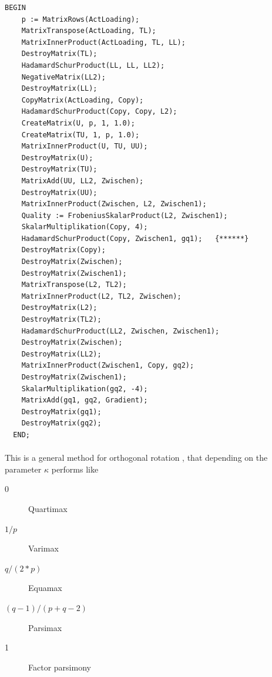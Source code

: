 \begin{lstlisting}[caption=Tandem criteria]
  BEGIN
    p := MatrixRows(ActLoading);
    MatrixTranspose(ActLoading, TL);
    MatrixInnerProduct(ActLoading, TL, LL);
    DestroyMatrix(TL);
    HadamardSchurProduct(LL, LL, LL2);
    NegativeMatrix(LL2);
    DestroyMatrix(LL);
    CopyMatrix(ActLoading, Copy);
    HadamardSchurProduct(Copy, Copy, L2);
    CreateMatrix(U, p, 1, 1.0);
    CreateMatrix(TU, 1, p, 1.0);
    MatrixInnerProduct(U, TU, UU);
    DestroyMatrix(U);
    DestroyMatrix(TU);
    MatrixAdd(UU, LL2, Zwischen);
    DestroyMatrix(UU);
    MatrixInnerProduct(Zwischen, L2, Zwischen1);
    Quality := FrobeniusSkalarProduct(L2, Zwischen1);
    SkalarMultiplikation(Copy, 4);
    HadamardSchurProduct(Copy, Zwischen1, gq1);   {******}
    DestroyMatrix(Copy);
    DestroyMatrix(Zwischen);
    DestroyMatrix(Zwischen1);
    MatrixTranspose(L2, TL2);
    MatrixInnerProduct(L2, TL2, Zwischen);
    DestroyMatrix(L2);
    DestroyMatrix(TL2);
    HadamardSchurProduct(LL2, Zwischen, Zwischen1);
    DestroyMatrix(Zwischen);
    DestroyMatrix(LL2);
    MatrixInnerProduct(Zwischen1, Copy, gq2);
    DestroyMatrix(Zwischen1);
    SkalarMultiplikation(gq2, -4);
    MatrixAdd(gq1, gq2, Gradient);
    DestroyMatrix(gq1);
    DestroyMatrix(gq2);
  END;
\end{lstlisting}

\paragraph{}

This is a general method for orthogonal rotation \parencite{Craw-70}, that depending on the parameter \(\kappa \) performs like
\begin{description}
  \item[0]{Quartimax}
  \item[\( 1/p \)]{Varimax}
  \item[\( q/(2*p) \)]{Equamax}
  \item[\( (q-1)/(p+q-2) \)]{Parsimax}
  \item[1]{Factor parsimony}
\end{description}

